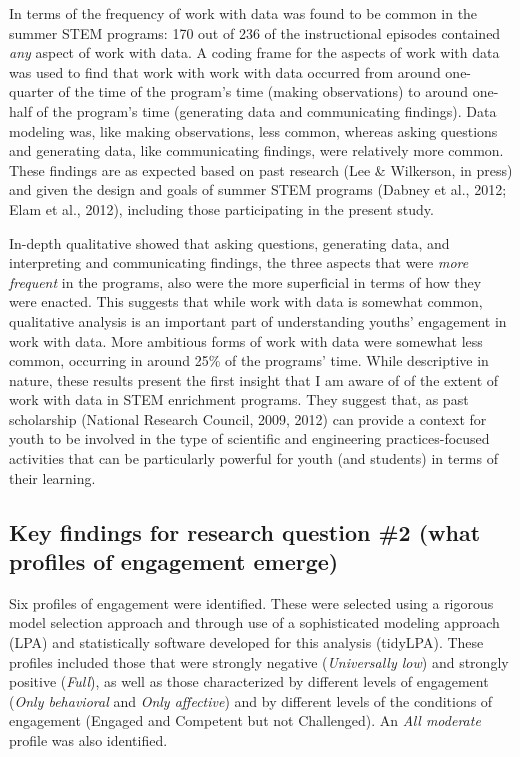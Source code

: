 \documentclass[]{book}
\theoremstyle{definition}
\theoremstyle{definition}
\theoremstyle{definition}
\theoremstyle{remark}
\begin{document}
In terms of the frequency of work with data was found to be common in
the summer STEM programs: 170 out of 236 of the instructional episodes
contained \emph{any} aspect of work with data. A coding frame for the
aspects of work with data was used to find that work with work with data
occurred from around one-quarter of the time of the program's time
(making observations) to around one-half of the program's time
(generating data and communicating findings). Data modeling was, like
making observations, less common, whereas asking questions and
generating data, like communicating findings, were relatively more
common. These findings are as expected based on past research (Lee \&
Wilkerson, in press) and given the design and goals of summer STEM
programs (Dabney et al., 2012; Elam et al., 2012), including those
participating in the present study.

In-depth qualitative showed that asking questions, generating data, and
interpreting and communicating findings, the three aspects that were
\emph{more frequent} in the programs, also were the more superficial in
terms of how they were enacted. This suggests that while work with data
is somewhat common, qualitative analysis is an important part of
understanding youths' engagement in work with data. More ambitious forms
of work with data were somewhat less common, occurring in around 25\% of
the programs' time. While descriptive in nature, these results present
the first insight that I am aware of of the extent of work with data in
STEM enrichment programs. They suggest that, as past scholarship
(National Research Council, 2009, 2012) can provide a context for youth
to be involved in the type of scientific and engineering
practices-focused activities that can be particularly powerful for youth
(and students) in terms of their learning.

\subsection{Key findings for research question \#2 (what profiles of
engagement
emerge)}\label{key-findings-for-research-question-2-what-profiles-of-engagement-emerge}

Six profiles of engagement were identified. These were selected using a
rigorous model selection approach and through use of a sophisticated
modeling approach (LPA) and statistically software developed for this
analysis (tidyLPA). These profiles included those that were strongly
negative (\emph{Universally low}) and strongly positive (\emph{Full}),
as well as those characterized by different levels of engagement
(\emph{Only behavioral} and \emph{Only affective}) and by different
levels of the conditions of engagement (Engaged and Competent but not
Challenged). An \emph{All moderate} profile was also identified.
\end{document}
